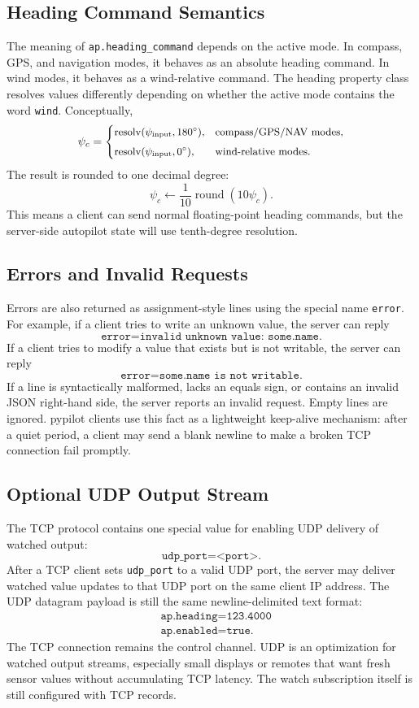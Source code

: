 \documentclass[11pt,twocolumn]{article}
\begin{document}
\subsection{Heading Command Semantics}
The meaning of \texttt{ap.heading\_command} depends on the active mode.
In compass, GPS, and navigation modes, it behaves as an absolute heading
command.  In wind modes, it behaves as a wind-relative command.  The
heading property class resolves values differently depending on whether
the active mode contains the word \texttt{wind}.  Conceptually,
\[
\small
\psi_c =
\begin{cases}
\operatorname{resolv}(\psi_{\mathrm{input}},180^\circ),
& \text{compass/GPS/NAV modes},\\[4pt]
\operatorname{resolv}(\psi_{\mathrm{input}},0^\circ),
& \text{wind-relative modes}.
\end{cases}
\]
The result is rounded to one decimal degree:
\[
\psi_c \leftarrow \frac{1}{10}
\operatorname{round}(10\psi_c).
\]
This means a client can send normal floating-point heading commands, but
the server-side autopilot state will use tenth-degree resolution.
\subsection{Errors and Invalid Requests}
Errors are also returned as assignment-style lines using the special name
\texttt{error}.  For example, if a client tries to write an unknown value,
the server can reply
\[
\texttt{error=invalid unknown value: some.name}.
\]
If a client tries to modify a value that exists but is not writable, the
server can reply
\[
\texttt{error=some.name is not writable}.
\]
If a line is syntactically malformed, lacks an equals sign, or contains an
invalid JSON right-hand side, the server reports an invalid request.  Empty
lines are ignored.  pypilot clients use this fact as a lightweight
keep-alive mechanism: after a quiet period, a client may send a blank
newline to make a broken TCP connection fail promptly.
\subsection{Optional UDP Output Stream}
The TCP protocol contains one special value for enabling UDP delivery of
watched output:
\[
\texttt{udp\_port=<port>}.
\]
After a TCP client sets \texttt{udp\_port} to a valid UDP port, the server
may deliver watched value updates to that UDP port on the same client IP
address.  The UDP datagram payload is still the same newline-delimited
text format:
\[
\begin{aligned}
&\texttt{ap.heading=123.4000}\\
&\texttt{ap.enabled=true}.
\end{aligned}
\]
The TCP connection remains the control channel.  UDP is an optimization
for watched output streams, especially small displays or remotes that want
fresh sensor values without accumulating TCP latency.  The watch
subscription itself is still configured with TCP records.
\end{document}
